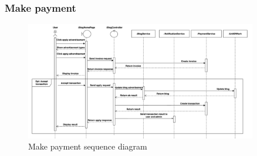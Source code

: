 \subsubsection{Make payment}

\begin{figure}[H]
    \centering
    \includegraphics[width=0.9\textwidth]{Figures/payment_seq.png}
    \caption{Make payment sequence diagram}
    \label{fig:make-payment-seq}
\end{figure}


